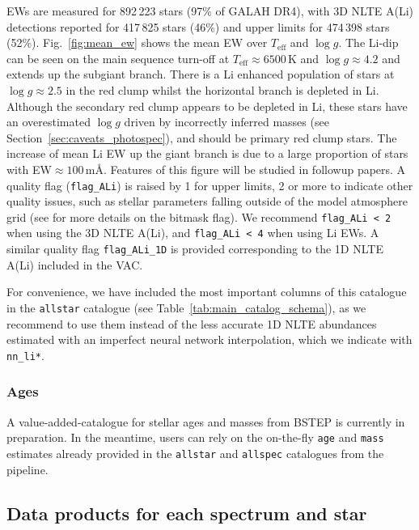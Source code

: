 \documentclass[
  journal=pasa,
  manuscript=research-paper, %
  year=2024,
  volume=37
]{cup-journal}
\newcommand{\Teff}{$T_\mathrm{eff}$\xspace}
\newcommand{\logg}{$\log g$\xspace}
\begin{document}
EWs are measured for 892\,223 stars (97\% of GALAH DR4), with 3D NLTE A(Li) detections reported for 417\,825 stars (46\%) and upper limits for 474\,398 stars (52\%). Fig.~\ref{fig:mean_ew} shows the mean EW over \Teff and \logg. The Li-dip can be seen on the main sequence turn-off at \Teff$\approx 6500$\,K and \logg$\approx 4.2$ and extends up the subgiant branch. There is a Li enhanced population of stars at \logg$\approx 2.5$ in the red clump whilst the horizontal branch is depleted in Li. Although the secondary red clump appears to be depleted in Li, these stars have an overestimated \logg driven by incorrectly inferred masses (see Section~\ref{sec:caveats_photospec}), and should be primary red clump stars. The increase of mean Li EW up the giant branch is due to a large proportion of stars with EW$\approx 100$\,m\AA. Features of this figure will be studied in followup papers. 
A quality flag (\texttt{flag\_ALi}) is raised by 1 for upper limits, 2 or more to indicate other quality issues, such as stellar parameters falling outside of the model atmosphere grid (see \citealt{Wang2024} for more details on the bitmask flag). We recommend \texttt{flag\_ALi < 2} when using the 3D NLTE A(Li), and \texttt{flag\_ALi < 4} when using Li EWs. A similar quality flag \texttt{flag\_ALi\_1D} is provided corresponding to the 1D NLTE A(Li) included in the VAC. 

For convenience, we have included the most important columns of this catalogue in the \texttt{allstar} catalogue (see Table~\ref{tab:main_catalog_schema}), as we recommend to use them instead of the less accurate 1D NLTE abundances estimated with an imperfect neural network interpolation, which we indicate with \texttt{nn\_li*}.

\subsubsection{Ages}

A value-added-catalogue for stellar ages and masses from BSTEP \citep{Sharma2018} is currently in preparation. In the meantime, users can rely on the on-the-fly \texttt{age} and \texttt{mass} estimates already provided in the \texttt{allstar} and \texttt{allspec} catalogues from the pipeline.

\subsection{Data products for each spectrum and star}
\label{sec:data_products_for_each_spectrum}
\end{document}
